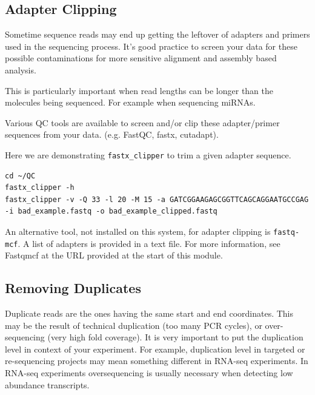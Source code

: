 \begin{advanced}
\subsection{Adapter Clipping}
Sometime sequence reads may end up getting the leftover of adapters and primers
used in the sequencing process. It's good practice to screen your data for
these possible contaminations for more sensitive alignment and assembly based
analysis.

\begin{note}
This is particularly important when read lengths can be longer than the
molecules being sequenced. For example when sequencing miRNAs.
\end{note}

Various QC tools are available to screen and/or clip these adapter/primer
sequences from your data. (e.g. FastQC, fastx, cutadapt).

\begin{steps}
Here we are demonstrating \texttt{fastx\_clipper} to trim a given adapter
sequence.

\begin{lstlisting}
cd ~/QC
fastx_clipper -h
fastx_clipper -v -Q 33 -l 20 -M 15 -a GATCGGAAGAGCGGTTCAGCAGGAATGCCGAG -i bad_example.fastq -o bad_example_clipped.fastq
\end{lstlisting}
\end{steps}

\begin{note}
An alternative tool, not installed on this system, for adapter clipping is
\texttt{fastq-mcf}. A list of adapters is provided in a text file. For more
information, see Fastqmcf at the URL provided at the start of this module.
\end{note}

\subsection{Removing Duplicates}
Duplicate reads are the ones having the same start and end coordinates. This
may be the result of technical duplication (too many PCR cycles), or
over-sequencing (very high fold coverage). It is very important to put the
duplication level in context of your experiment. For example, duplication level
in targeted or re-sequencing projects may mean something different in RNA-seq
experiments. In RNA-seq experiments oversequencing is usually necessary when
detecting low abundance transcripts.


\end{advanced}

